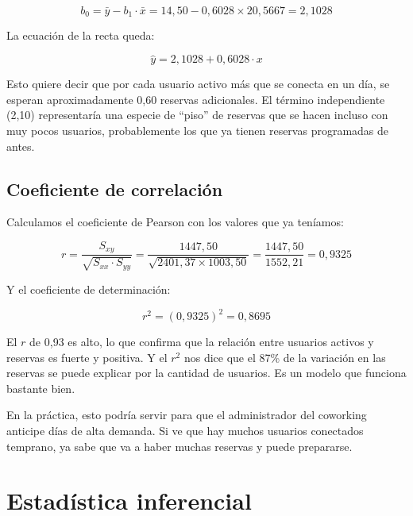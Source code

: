 \documentclass[12pt,a4paper]{article}
\begin{document}
$$b_0 = \bar{y} - b_1 \cdot \bar{x} = 14{,}50 - 0{,}6028 \times 20{,}5667 = 2{,}1028$$
\vspace{4pt}

La ecuación de la recta queda:

\vspace{4pt}
$$\boxed{\hat{y} = 2{,}1028 + 0{,}6028 \cdot x}$$
\vspace{4pt}

Esto quiere decir que por cada usuario activo más que se conecta en un día, se esperan aproximadamente 0,60 reservas adicionales. El término independiente (2,10) representaría una especie de ``piso'' de reservas que se hacen incluso con muy pocos usuarios, probablemente los que ya tienen reservas programadas de antes.

\subsection{Coeficiente de correlación}

Calculamos el coeficiente de Pearson con los valores que ya teníamos:

\vspace{4pt}
$$r = \frac{S_{xy}}{\sqrt{S_{xx} \cdot S_{yy}}} = \frac{1447{,}50}{\sqrt{2401{,}37 \times 1003{,}50}} = \frac{1447{,}50}{1552{,}21} = 0{,}9325$$
\vspace{4pt}

Y el coeficiente de determinación:

\vspace{4pt}
$$r^2 = (0{,}9325)^2 = 0{,}8695$$
\vspace{4pt}

El $r$ de 0,93 es alto, lo que confirma que la relación entre usuarios activos y reservas es fuerte y positiva. Y el $r^2$ nos dice que el 87\% de la variación en las reservas se puede explicar por la cantidad de usuarios. Es un modelo que funciona bastante bien.

En la práctica, esto podría servir para que el administrador del coworking anticipe días de alta demanda. Si ve que hay muchos usuarios conectados temprano, ya sabe que va a haber muchas reservas y puede prepararse.

\section{Estadística inferencial}
\end{document}
